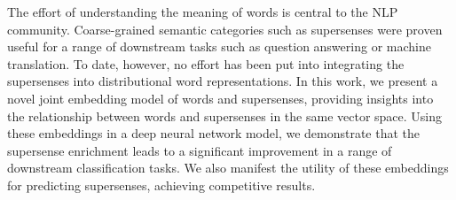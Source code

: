 The effort of understanding the meaning of words is central to the NLP community.  Coarse-grained semantic categories such as supersenses were proven useful for a range of downstream tasks such as question answering or machine translation. To date, however, no effort has been put into integrating the supersenses into distributional word representations. In this work, we present a novel joint embedding model of words and supersenses, providing insights into the relationship between words and supersenses in the same vector space. Using these embeddings in a deep neural network model, we demonstrate that the supersense enrichment leads to a significant improvement in a range of downstream classification tasks. We also manifest the utility of these embeddings for predicting supersenses, achieving competitive results.
